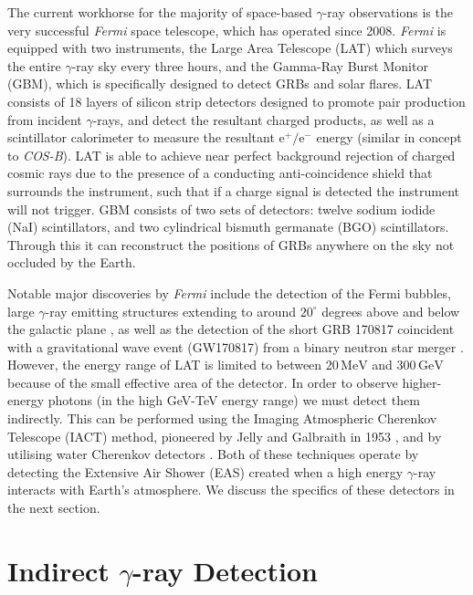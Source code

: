 The current workhorse for the majority of space-based $\gamma$-ray observations is the very successful \textit{Fermi} space telescope, which has operated since 2008. \textit{Fermi} is equipped with two instruments, the Large Area Telescope (LAT) which surveys the entire $\gamma$-ray sky every three hours, and the Gamma-Ray Burst Monitor (GBM), which is specifically designed to detect GRBs and solar flares. LAT consists of 18 layers of silicon strip detectors designed to promote pair production from incident $\gamma$-rays, and detect the resultant charged products, as well as a scintillator calorimeter to measure the resultant $\mathrm{e^+/e^-}$ energy (similar in concept to \textit{COS-B}). LAT is able to achieve near perfect background rejection of charged cosmic rays due to the presence of a conducting anti-coincidence shield that surrounds the instrument, such that if a charge signal is detected the instrument will not trigger. GBM consists of two sets of detectors: twelve sodium iodide (NaI) scintillators, and two cylindrical bismuth germanate (BGO) scintillators. Through this it can reconstruct the positions of GRBs anywhere on the sky not occluded by the Earth. 

Notable major discoveries by \textit{Fermi} include the detection of the Fermi bubbles, large $\gamma$-ray emitting structures extending to around $\mathrm{20^{\circ}}$ degrees above and below the galactic plane \cite{hooperslayter}, as well as the detection of the short GRB 170817 coincident with a gravitational wave event (GW170817) from a binary neutron star merger \cite{ligogrb}. However, the energy range of LAT is limited to between $\mathrm{20\,MeV}$ and $\mathrm{300\,GeV}$ because of the small effective area of the detector. In order to observe higher-energy photons (in the high GeV-TeV energy range) we must detect them indirectly. This can be performed using the Imaging Atmospheric Cherenkov Telescope (IACT) method, pioneered by Jelly and Galbraith in 1953 \cite{G+J}, and by utilising water Cherenkov detectors  \cite{hawc}. Both of these techniques operate by detecting the Extensive Air Shower (EAS) created when a high energy $\gamma$-ray interacts with Earth's atmosphere. We discuss the specifics of these detectors in the next section. 

\section{Indirect \ensuremath{\gamma}-ray Detection}
